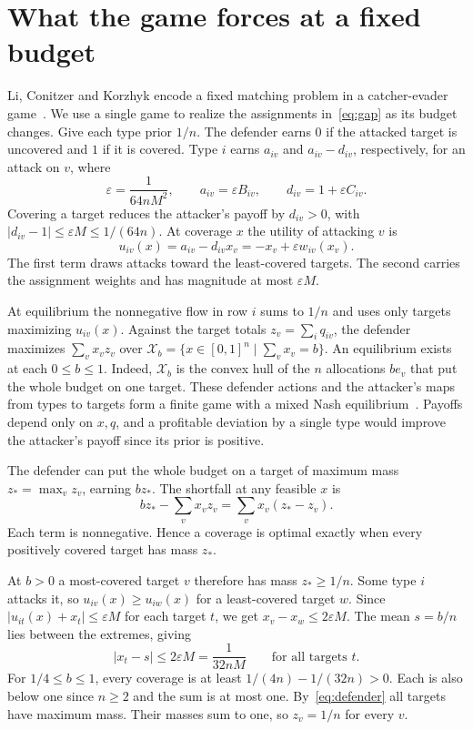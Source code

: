 \documentclass[11pt,letterpaper]{article}
\theoremstyle{definition}
\newcommand{\X}{\mathcal{X}}
\begin{document}
\section{What the game forces at a fixed budget}\label{sec:game}

Li, Conitzer and Korzhyk encode a fixed matching problem in a catcher-evader
game~\cite[\S6.1]{LCK}. We use a single game to realize the assignments
in~\eqref{eq:gap} as its budget changes. Give each type prior \(1/n\).
The defender earns \(0\) if the attacked target is uncovered and \(1\)
if it is covered. Type \(i\) earns \(a_{iv}\)
and \(a_{iv}-d_{iv}\), respectively, for an attack on \(v\), where
\[
  \varepsilon=\frac1{64nM^2},\qquad
  a_{iv}=\varepsilon B_{iv},\qquad d_{iv}=1+\varepsilon C_{iv}.
\]
Covering a target reduces the attacker's payoff by \(d_{iv}>0\), with
\(|d_{iv}-1|\le\varepsilon M\le1/(64n)\). At coverage \(x\) the utility
of attacking \(v\) is
\[
  u_{iv}(x)=a_{iv}-d_{iv}x_v=-x_v+\varepsilon w_{iv}(x_v).
\]
The first term draws attacks toward the least-covered targets. The second
carries the assignment weights and has magnitude at most \(\varepsilon M\).

At equilibrium the nonnegative flow in row \(i\) sums to \(1/n\) and uses
only targets maximizing \(u_{iv}(x)\). Against the target totals
\(z_v=\sum_iq_{iv}\), the defender maximizes \(\sum_v x_vz_v\) over
\(\X_b=\{x\in[0,1]^n\mid\sum_v x_v=b\}\). An equilibrium exists at each
\(0\le b\le1\). Indeed, \(\X_b\) is the convex hull of the \(n\) allocations
\(b e_v\) that put the whole budget on one target. These defender actions
and the attacker's maps from types to targets form a finite game with a mixed
Nash equilibrium~\cite{Nash}. Payoffs depend only on \(x,q\), and a profitable
deviation by a single type would improve the attacker's payoff since its prior
is positive.

The defender can put the whole budget on a target of maximum mass
\(z_*=\max_v z_v\), earning \(bz_*\). The shortfall at any feasible \(x\) is
\begin{equation}
  bz_*-\sum_v x_vz_v=\sum_v x_v(z_*-z_v).
  \label{eq:defender}
\end{equation}
Each term is nonnegative. Hence a coverage is optimal exactly when every
positively covered target has mass \(z_*\).

At \(b>0\) a most-covered target \(v\) therefore has mass \(z_*\ge1/n\).
Some type \(i\) attacks it, so \(u_{iv}(x)\ge u_{iw}(x)\) for a
least-covered target \(w\). Since \(|u_{it}(x)+x_t|\le\varepsilon M\)
for each target \(t\), we get \(x_v-x_w\le2\varepsilon M\). The mean
\(s=b/n\) lies between the extremes, giving
\begin{equation}
  |x_t-s|\le2\varepsilon M=\frac1{32nM}\qquad\text{for all targets }t.
  \label{eq:spread}
\end{equation}
For \(1/4\le b\le1\), every coverage is at least
\(1/(4n)-1/(32n)>0\). Each is also below one since \(n\ge2\) and the
sum is at most one. By~\eqref{eq:defender} all targets have maximum mass.
Their masses sum to one, so \(z_v=1/n\) for every \(v\).
\end{document}
